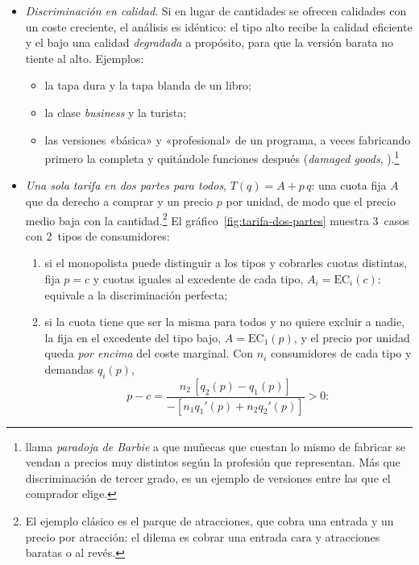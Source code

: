 \documentclass[11pt]{article}
\begin{document}
\begin{itemize}
\item \emph{Discriminación en calidad}. Si en lugar de cantidades se ofrecen calidades con un coste creciente, el análisis es idéntico: el tipo alto recibe la calidad eficiente y el bajo una calidad \emph{degradada} a propósito, para que la versión barata no tiente al alto\nocite{MussaRosen1978Monopoly}. Ejemplos:
  \begin{itemize}
  \item la tapa dura y la tapa blanda de un libro;
  \item la clase \emph{business} y la turista;
  \item las versiones «básica» y «profesional» de un programa, a veces fabricando primero la completa y quitándole funciones después (\emph{damaged goods}, \textcite{DeneckereMcAfee1996Damaged}).\footnote{ llama \emph{paradoja de Barbie} a que muñecas que cuestan lo mismo de fabricar se vendan a precios muy distintos según la profesión que representan\nocite{SalaiMartin2013Barbie}. Más que discriminación de tercer grado, es un ejemplo de versiones entre las que el comprador elige.}
  \end{itemize}
\item \emph{Una sola tarifa en dos partes para todos}, $T(q)=A+p\,q$: una cuota fija $A$ que da derecho a comprar y un precio $p$ por unidad, de modo que el precio medio baja con la cantidad.\footnote{El ejemplo clásico es el parque de atracciones, que cobra una entrada y un precio por atracción\nocite{Oi1971Disneyland}: el dilema es cobrar una entrada cara y atracciones baratas o al revés.} El gráfico~\ref{fig:tarifa-dos-partes} muestra 3~casos con 2~tipos de consumidores:
  \begin{enumerate}[label=\roman*)]
  \item si el monopolista puede distinguir a los tipos y cobrarles cuotas distintas, fija $p=c$ y cuotas iguales al excedente de cada tipo, $A_i=\mathrm{EC}_i(c)$: equivale a la discriminación perfecta;
  \item si la cuota tiene que ser la misma para todos y no quiere excluir a nadie, la fija en el excedente del tipo bajo, $A=\mathrm{EC}_1(p)$, y el precio por unidad queda \emph{por encima} del coste marginal\nocite{Oi1971Disneyland}. Con $n_i$ consumidores de cada tipo y demandas $q_i(p)$,
    \begin{equation}
    p-c=\frac{n_2\,[q_2(p)-q_1(p)]}{-[n_1q_1'(p)+n_2q_2'(p)]}>0 :
    \end{equation}

\end{enumerate}
\end{itemize}
\end{document}
